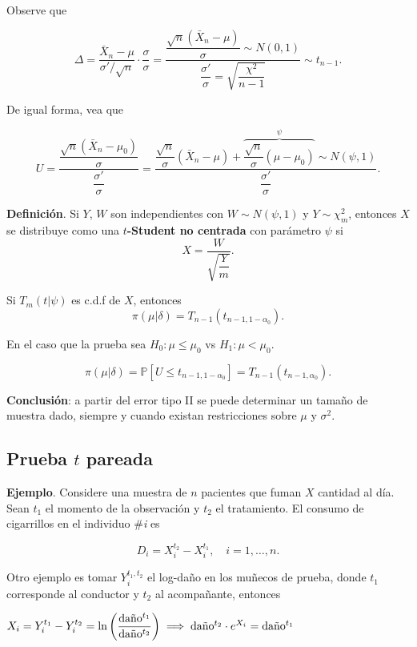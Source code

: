 \documentclass[
  12pt,
]{book}
\begin{document}
Observe que

\[\Delta = \dfrac{\bar X_n -\mu}{\sigma' /\sqrt n}\cdot\dfrac\sigma\sigma = \dfrac{\dfrac{\sqrt n(\bar X_n-\mu)}{\sigma} \sim N(0,1)}{\dfrac{\sigma'}\sigma = \sqrt{\dfrac{\chi^2}{n-1}}} \sim t_{n-1}.\]

De igual forma, vea que

\[ U = \dfrac{\dfrac{\sqrt n(\bar X_n-\mu_0)}{\sigma}}{\dfrac{\sigma'}{\sigma}} =  \dfrac{\dfrac{\sqrt n}{\sigma}(\bar X_n-\mu) +\overbrace{\dfrac{\sqrt n}{\sigma}(\mu-\mu_0)}^{\psi}  \sim N(\psi,1)}{\dfrac{\sigma'}{\sigma}}.\]

\textbf{Definición}. Si \(Y\), \(W\) son independientes con \(W\sim N(\psi,1)\) y \(Y\sim \chi^2_m\), entonces \(X\) se distribuye como una \textbf{\(t\)-Student no centrada} con parámetro \(\psi\) si
\[X = \dfrac W{\sqrt{\dfrac{Y}{m}}}.\]

Si \(T_m(t|\psi)\) es c.d.f de \(X\), entonces
\[\pi(\mu|\delta)= T_{n-1}(t_{n-1,1-\alpha_0}).\]

En el caso que la prueba sea \(H_0: \mu\leq \mu_0\) vs \(H_1: \mu<\mu_0\).

\[\pi(\mu|\delta)= \mathbb P[U\leq t_{n-1,1-\alpha_0}] = T_{n-1}(t_{n-1,\alpha_0}).\]

\textbf{Conclusión}: a partir del error tipo II se puede determinar un tamaño de muestra dado, siempre y cuando existan restricciones sobre \(\mu\) y \(\sigma^2\).

\hypertarget{prueba-t-pareada}{%
\subsection{\texorpdfstring{Prueba \(t\) pareada}{Prueba t pareada}}\label{prueba-t-pareada}}

\textbf{Ejemplo}. Considere una muestra de \(n\) pacientes que fuman \(X\) cantidad al día. Sean \(t_1\) el momento de la observación y \(t_2\) el tratamiento. El consumo de cigarrillos en el individuo \#\emph{i} es

\[D_i = X_i^{t_2}-X_i^{t_1},\quad i = 1,\dots,n.\]

Otro ejemplo es tomar \(Y_i^{t_1,t_2}\) el log-daño en los muñecos de prueba, donde \(t_1\) corresponde al conductor y \(t_2\) al acompañante, entonces

\(X_i = Y_i^{t_1}-Y_i^{t_2} = \ln\left(\dfrac{\text{da}\tilde{\text n}\text{o}^{t_1}}{\text{da}\tilde{\text n}\text{o}^{t_2}}\right) \implies \text{da}\tilde{\text n}\text{o}^{t_2}\cdot e^{X_i} = \text{da}\tilde{\text n}\text{o}^{t_1}\)
\end{document}
